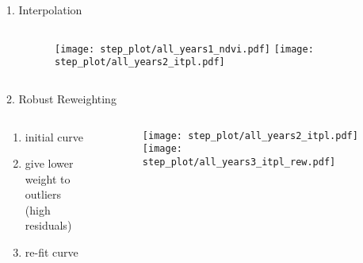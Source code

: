 




\begin{frame}[t]{1. Interpolation}
    \begin{columns}
        \begin{column}{0.45\textwidth}

        \end{column}
        \begin{column}{0.45\textwidth}
            \begin{figure}
                \vspace{-1.6cm}
                \texttt{[image: step\_plot/all\_years1\_ndvi.pdf]}
                \texttt{[image: step\_plot/all\_years2\_itpl.pdf]}
            \end{figure}
        \end{column}
    \end{columns}
\end{frame}

\begin{frame}[t]{2. Robust Reweighting}
    \begin{columns}
        \begin{column}{0.45\textwidth}
            \begin{enumerate}
                \item initial curve
                \item give lower weight to outliers\\ (high residuals)
                \item re-fit curve
            \end{enumerate}
        \end{column}
        \begin{column}{0.45\textwidth}
            \begin{figure}
                \vspace{-1.6cm}
                \texttt{[image: step\_plot/all\_years2\_itpl.pdf]}
                \texttt{[image: step\_plot/all\_years3\_itpl\_rew.pdf]}
            \end{figure}
        \end{column}
    \end{columns}
\end{frame}

